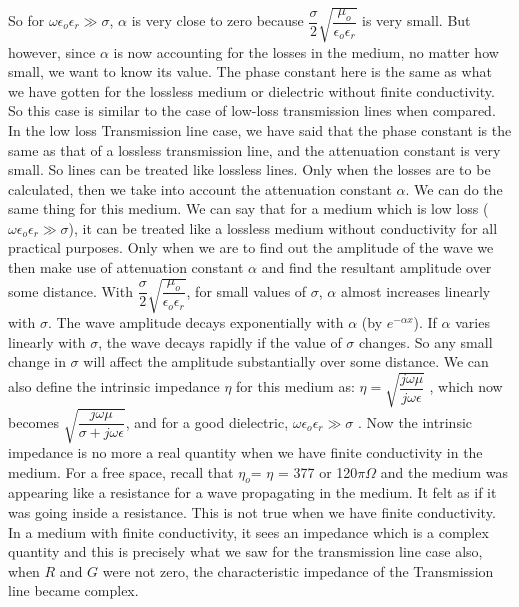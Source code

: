 So for $\omega\epsilon_{o}\epsilon_{r} \gg \sigma$, $\alpha$ is very close to zero because $\dfrac{\sigma}{2}\sqrt{\dfrac{\mu_{o}}{\epsilon_{o}\epsilon_{r}}}$ is very small. But however, since $\alpha$ is now accounting for the losses in the medium, no matter how small, we want to know its value. The phase constant here is the same as what we have gotten for the lossless medium or dielectric without finite conductivity. So this case is similar to the case of low-loss transmission lines when compared.
In the low loss Transmission line case, we have said that the phase constant is the same as that of a lossless transmission line, and the attenuation constant is very small. So lines can be treated like lossless lines. Only when the losses are to be calculated, then we take into account the attenuation constant $\alpha$. We can do the same thing for this medium. We can say that for a medium which is low loss ($\omega\epsilon_{o}\epsilon_{r} \gg \sigma$), it can be treated like a lossless medium without conductivity for all practical purposes. Only when we are to find out the amplitude of the wave we then make use of attenuation constant $\alpha$ and find the resultant amplitude over some distance. With $\dfrac{\sigma}{2}\sqrt{\dfrac{\mu_{o}}{\epsilon_{o}\epsilon_{r}}}$, for small values of $\sigma$, $\alpha$ almost increases linearly with $\sigma$. The wave amplitude decays exponentially with $\alpha$ (by $e^{-\alpha x}$). If $\alpha$ varies linearly with $\sigma$, the wave decays rapidly if the value of $\sigma$ changes. So any small change in $\sigma$ will affect the amplitude substantially over some distance. 
We can also define the intrinsic impedance $\eta$ for this medium as:
$\eta= \sqrt{\dfrac{j\omega\mu}{j\omega\epsilon}}$ , which now becomes $\sqrt{\dfrac{j\omega\mu}{\sigma + j\omega\epsilon}}$, and for a good dielectric, $\omega\epsilon_{o}\epsilon_{r} \gg \sigma$ . Now the intrinsic impedance is no more a real quantity when we have finite conductivity in the medium. For a free space, recall that $\eta_{o}$= $\eta$ = 377 or 120$\pi\Omega$ and the medium was appearing like a resistance for a wave propagating in the medium. It felt as if it was going inside a resistance. This is not true when we have finite conductivity. In a medium with finite conductivity, it sees an impedance which is a complex quantity and this is precisely what we saw for the transmission line case also, when $R$ and $G$ were not zero, the characteristic impedance of the Transmission line became complex.
